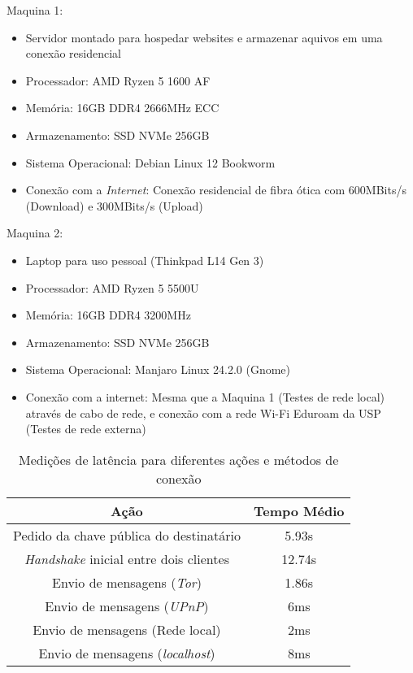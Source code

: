 Maquina 1:

\begin{tcolorbox}[colback=gray!10, colframe=gray, sharp corners=south]
\begin{itemize}
    \setlength\itemsep{0em}
    \setlength\leftmargini{2em}
    \item Servidor montado para hospedar websites e armazenar aquivos em uma conexão residencial
    \item Processador: AMD Ryzen 5 1600 AF
    \item Memória: 16GB DDR4 2666MHz ECC
    \item Armazenamento: SSD NVMe 256GB
    \item Sistema Operacional: Debian Linux 12 Bookworm
    \item Conexão com a \textit{Internet}: Conexão residencial de fibra ótica com 600MBits/s (Download) e 300MBits/s (Upload)
\end{itemize}
\end{tcolorbox}

Maquina 2:

\begin{tcolorbox}[colback=gray!10, colframe=gray, sharp corners=south]
\begin{itemize}
    \setlength\itemsep{0em}
    \setlength\leftmargini{2em}
    \item Laptop para uso pessoal (Thinkpad L14 Gen 3)
    \item Processador: AMD Ryzen 5 5500U
    \item Memória: 16GB DDR4 3200MHz
    \item Armazenamento: SSD NVMe 256GB
    \item Sistema Operacional: Manjaro Linux 24.2.0 (Gnome)
    \item Conexão com a internet: Mesma que a Maquina 1 (Testes de rede local) através de cabo de rede, e conexão com a rede Wi-Fi Eduroam da USP (Testes de rede externa)
\end{itemize}
\end{tcolorbox}

\begin{table}[H]
\centering
\begin{tabular}{|c|c|}
\hline
\textbf{Ação} & \textbf{Tempo Médio} \\ \hline
Pedido da chave pública do destinatário & 5.93s \\ \hline
\textit{Handshake} inicial entre dois clientes & 12.74s \\ \hline
Envio de mensagens (\textit{Tor}) & 1.86s \\ \hline
Envio de mensagens (\textit{UPnP}) & 6ms \\ \hline
Envio de mensagens (Rede local) & 2ms \\ \hline
Envio de mensagens (\textit{localhost}) & 8ms \\ \hline
\end{tabular}
\caption{Medições de latência para diferentes ações e métodos de conexão}
\label{tab:latencia}
\end{table}

